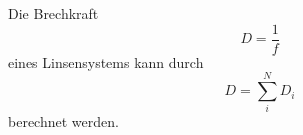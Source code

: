     \noindent Die Brechkraft
    \begin{equation}
        \label{eqn.Brechkraft}
        D=\frac{1}{f}
    \end{equation}
    eines Linsensystems kann durch
    \begin{equation}
        D=\sum_i^N{D_i}
        \label{Brechkraft2}
    \end{equation}
    berechnet werden.

    \cite{V408}


